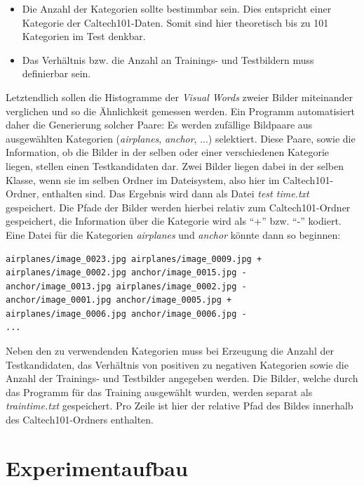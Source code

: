 \begin{itemize}
	\item Die Anzahl der Kategorien sollte bestimmbar sein. Dies entspricht einer Kategorie der Caltech101-Daten. Somit sind hier theoretisch bis zu 101 Kategorien im Test denkbar.
	\item Das Verhältnis bzw. die Anzahl an Trainings- und Testbildern muss definierbar sein.
\end{itemize}

Letztendlich sollen die Histogramme der \textit{Visual Words} zweier Bilder miteinander verglichen und so die Ähnlichkeit gemessen werden. Ein Programm automatisiert daher die Generierung solcher Paare: Es werden zufällige Bildpaare aus ausgewählten Kategorien (\textit{airplanes}, \textit{anchor}, ...) selektiert. Diese Paare, sowie die Information, ob die Bilder in der selben oder einer verschiedenen Kategorie liegen, stellen einen Testkandidaten dar. Zwei Bilder liegen dabei in der selben Klasse, wenn sie im selben Ordner im Dateisystem, also hier im Caltech101-Ordner, enthalten sind. Das Ergebnis wird dann als Datei \textit{test \textunderscore time.txt} gespeichert. Die Pfade der Bilder werden hierbei relativ zum Caltech101-Ordner gespeichert, die Information über die Kategorie wird als \enquote{+} bzw. \enquote{-} kodiert. Eine Datei für die Kategorien \textit{airplanes} und \textit{anchor} könnte dann so beginnen:\newline

\begin{lstlisting}
airplanes/image_0023.jpg airplanes/image_0009.jpg +
airplanes/image_0002.jpg anchor/image_0015.jpg -
anchor/image_0013.jpg airplanes/image_0002.jpg -
anchor/image_0001.jpg anchor/image_0005.jpg +
airplanes/image_0006.jpg anchor/image_0006.jpg -
...
\end{lstlisting}

Neben den zu verwendenden Kategorien muss bei Erzeugung die Anzahl der Testkandidaten, das Verhältnis von positiven zu negativen Kategorien sowie die Anzahl der Trainings- und Testbilder angegeben werden. \newline
Die Bilder, welche durch das Programm für das Training ausgewählt wurden, werden separat als \textit{train\textunderscore time.txt} gespeichert. Pro Zeile ist hier der relative Pfad des Bildes innerhalb des Caltech101-Ordners enthalten.

\section{Experimentaufbau}

